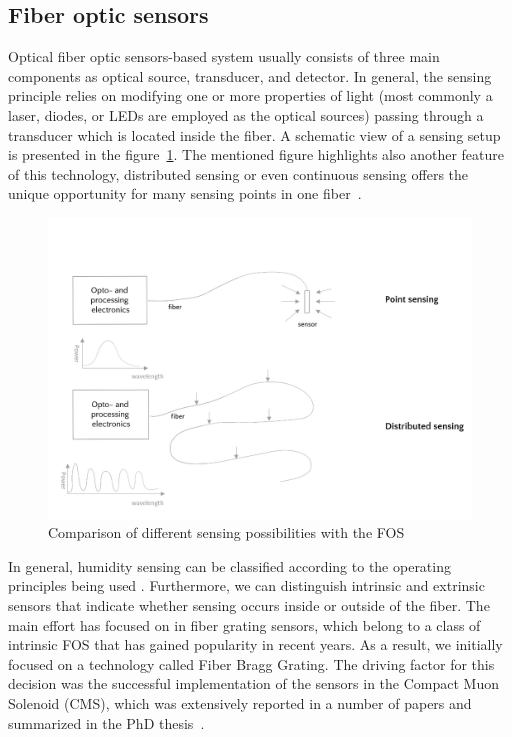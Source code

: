 \subsection{Fiber optic sensors}
\label{FOS}
Optical fiber optic sensors-based system usually consists of three main components as optical source, transducer, and detector. In general, the sensing principle relies on modifying one or more properties of light (most commonly a laser, diodes, or LEDs are employed as the optical sources) passing through a transducer which is located inside the fiber. A schematic view of a sensing setup is presented in the figure~\ref{fig:sensing}.  The mentioned figure highlights also another feature of this technology, distributed sensing or even continuous sensing offers the unique opportunity for many sensing points in one fiber~\cite{GRATTAN200040}. 
\newpage
\begin{figure}[!h]
\centering
\includegraphics[width=0.95\columnwidth]{Chapter5/images/sensing.png}
\caption{Comparison of different sensing possibilities with the \gls{FOS}}
\label{fig:sensing}
\end{figure}

In general, humidity sensing can be classified according to the operating principles being used \cite{fos_overview}. Furthermore, we can distinguish intrinsic and extrinsic sensors that indicate whether sensing occurs inside or outside of the fiber. The main effort has focused on in fiber grating sensors, which belong to a class of intrinsic \gls{FOS} that has gained popularity in recent years. As a result, we initially focused on a technology called Fiber Bragg Grating. The driving factor for this decision was the successful implementation of the sensors in the Compact Muon Solenoid (\gls{CMS}), which was extensively reported in a number of papers and summarized in the PhD thesis~\cite{Berruti}.


